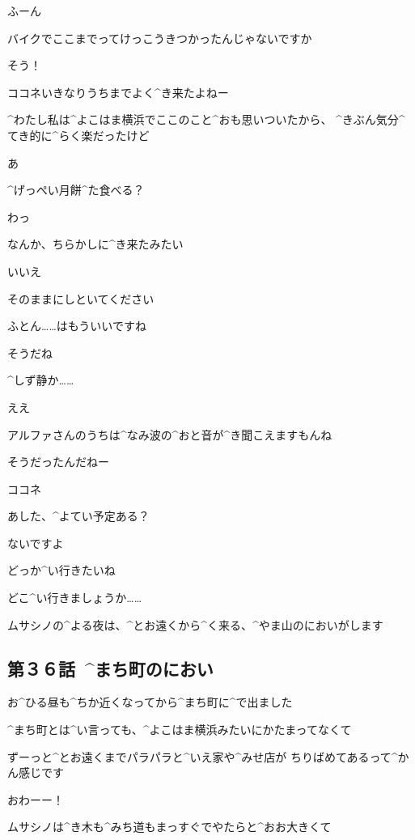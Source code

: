 \Alpha ふーん

\page
\Kokone バイクでここまでってけっこうきつかったんじゃないですか

\Alpha そう！

\Alpha ココネいきなりうちまでよく^{き}{来}たよねー

\Alpha ^{わたし}{私}は^{よこはま}{横浜}でここのこと^{おも}{思}いついたから、
^{きぶん}{気分}^{てき}{的}に^{らく}{楽}だったけど

\Alpha あ

\Alpha ^{げっぺい}{月餅}^{た}{食}べる？

\Kokone わっ

\page[51]
\Alpha なんか、ちらかしに^{き}{来}たみたい

\Kokone いいえ

\Kokone そのままにしといてください

\Kokone ふとん……はもういいですね

\Alpha そうだね

\page[53]
\Alpha ^{しず}{静}か……

\Kokone ええ

\Kokone アルファさんのうちは^{なみ}{波}の^{おと}{音}が^{き}{聞}こえますもんね

\Alpha そうだったんだねー

\page
\Alpha ココネ

\Alpha あした、^{よてい}{予定}ある？

\Kokone ないですよ

\Alpha どっか^{い}{行}きたいね

\Kokone どこ^{い}{行}きましょうか……

\page[56]
\Alpha ムサシノの^{よる}{夜}は、^{とお}{遠}くから^{く}{来}る、^{やま}{山}のにおいがします


\subsection{第３６話\ ^{まち}{町}のにおい}

\page[58]
\Alpha お^{ひる}{昼}も^{ちか}{近}くなってから^{まち}{町}に^{で}{出}ました

\page
\Alpha ^{まち}{町}とは^{い}{言}っても、^{よこはま}{横浜}みたいにかたまってなくて

\Alpha ずーっと^{とお}{遠}くまでパラパラと^{いえ}{家}や^{みせ}{店}が
ちりばめてあるって^{かん}{感}じです

\Alpha おわーー！

\page
\Alpha ムサシノは^{き}{木}も^{みち}{道}もまっすぐでやたらと^{おお}{大}きくて

